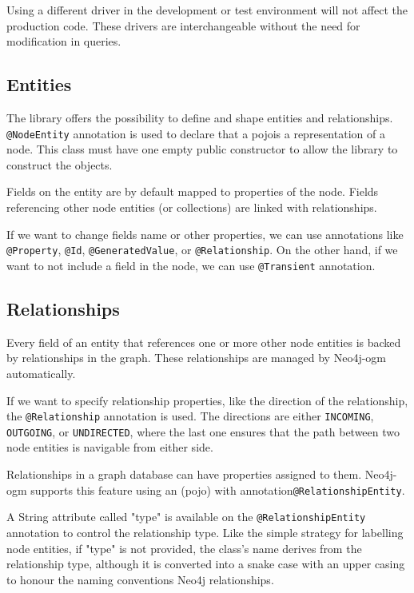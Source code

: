 Using a different driver in the development or test environment will not affect the production code. These drivers are interchangeable without the need for modification in queries.

\subsection {Entities}

The library offers the possibility to define and shape entities and relationships.
\texttt{@NodeEntity} annotation is used to declare that a \acrfull{pojo}is a representation of a node.
This class must have one empty public constructor to allow the library to construct the objects.

Fields on the entity are by default mapped to properties of the node. Fields referencing other node entities (or collections) are linked with relationships.

If we want to change fields name or other properties, we can use annotations like \texttt{@Property}, \texttt{@Id}, \texttt{@GeneratedValue}, or \texttt{@Relationship}.
On the other hand, if we want to not include a field in the node, we can use \texttt{@Transient} annotation.

\subsection {Relationships}

Every field of an entity that references one or more other node entities is backed by relationships in the graph. These relationships are managed by Neo4j-\acrshort{ogm} automatically.

If we want to specify relationship properties, like the direction of the relationship, the \texttt{@Relationship} annotation is used.
The directions are either \texttt{INCOMING}, \texttt{OUTGOING}, or \texttt{UNDIRECTED}, where the last one ensures that the path between two node entities is navigable from either side.

Relationships in a graph database can have properties assigned to them. Neo4j-\acrshort{ogm} supports this feature using an (\acrshort{pojo}) with annotation\linebreak\texttt{@RelationshipEntity}.

A String attribute called "type" is available on the \texttt{@RelationshipEntity} annotation to control the relationship type.
Like the simple strategy for labelling node entities, if "type" is not provided, the class's name derives from the relationship type, although it is converted into a snake case with an upper casing to honour the naming conventions Neo4j relationships. \cite{noauthor_reference_nodate}

